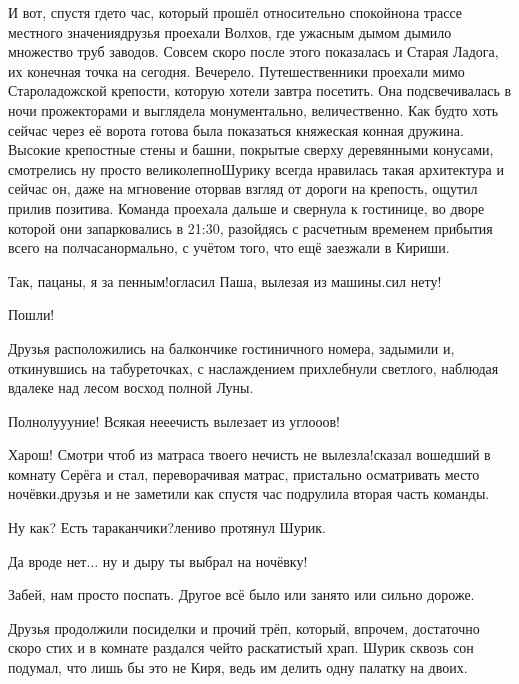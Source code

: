 И вот, спустя где\sdash то час, который прошёл относительно спокойно\mdash на трассе местного значения\mdash друзья проехали Волхов, где ужасным дымом дымило множество труб заводов. Совсем скоро после этого показалась и Старая Ладога, их конечная точка на сегодня. Вечерело. Путешественники проехали мимо Староладожской крепости, которую хотели завтра посетить. Она подсвечивалась в ночи прожекторами и выглядела монументально, величественно. Как будто хоть сейчас через её ворота готова была показаться княжеская конная дружина. Высокие крепостные стены и башни, покрытые сверху деревянными конусами, смотрелись ну просто великолепно\mdash Шурику всегда нравилась такая архитектура и сейчас он, даже на мгновение оторвав взгляд от дороги на крепость, ощутил прилив позитива. Команда проехала дальше и свернула к гостинице, во дворе которой они запарковались в 21:30, разойдясь с расчетным временем прибытия всего на полчаса\mdash нормально, с учётом того, что ещё заезжали в Кириши.

\diagdash Так, пацаны, я за пенным!\mdash огласил Паша, вылезая из машины.\mdash сил нету!

\diagdash Пошли!

Друзья расположились на балкончике гостиничного номера, задымили и, откинувшись на табуреточках, с наслаждением прихлебнули светлого, наблюдая вдалеке над лесом восход полной Луны.

\diagdash Полнолу\sdash у\sdash уние! Всякая не\sdash е\sdash ечисть вылезает из угло\sdash о\sdash ов!

\diagdash Харош! Смотри чтоб из матраса твоего нечисть не вылезла!\mdash сказал вошедший в комнату Серёга и стал, переворачивая матрас, пристально осматривать место ночёвки.\mdash друзья и не заметили как спустя час подрулила вторая часть команды.

\diagdash Ну как? Есть тараканчики?\mdash лениво протянул Шурик.

\diagdash Да вроде нет$\ldots$ ну и дыру ты выбрал на ночёвку! 

\diagdash Забей, нам просто поспать. Другое всё было или занято или сильно дороже.

Друзья продолжили посиделки и прочий трёп, который, впрочем, достаточно скоро стих и в комнате раздался чей\sdash то раскатистый храп. Шурик сквозь сон подумал, что лишь бы это не Киря, ведь им делить одну палатку на двоих.

\begin{center}
\end{center}